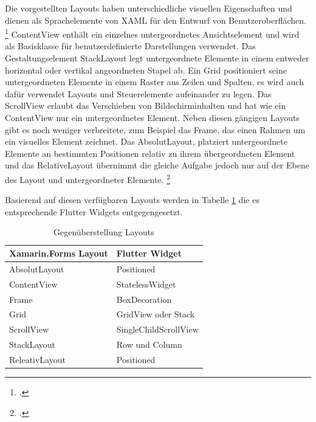 Die vorgestellten Layouts haben  unterschiedliche visuellen Eigenschaften und dienen als Sprachelemente von XAML für den Entwurf von Benutzeroberflächen.  \footcitetext[Abbildung in Anlehnung an ][Abgerufen am \today]{MicrosoftXamLayouts2018} \glq ContentView\grq{} enthält ein einzelnes untergeordnetes Ansichtselement und wird als Basisklasse für benutzerdefinierte Darstellungen verwendet.  Das Gestaltungselement \glq StackLayout\grq{} legt untergeordnete Elemente in einem entweder horizontal oder vertikal angeordneten Stapel ab.  Ein \glq Grid\grq{} positioniert seine untergeordneten Elemente in einem Raster aus Zeilen und Spalten,  es wird auch dafür verwendet Layouts und Steuerelemente aufeinander zu legen.  Das \glq ScrollView\grq{} erlaubt das Verschieben von Bildschirminhalten und hat wie ein \glq ContentView\grq{} nur ein untergeordnetes Element.  
Neben diesen gängigen Layouts gibt es noch weniger verbreitete,  zum Beispiel  das \glq  Frame\grq{}, das einen Rahmen um ein visuelles Element zeichnet.  Das \glq AbsolutLayout\grq{},  platziert untergeordnete Elemente an bestimmten Positionen relativ zu ihrem übergeordneten Element und das \glq RelativeLayout\grq{} übernimmt die gleiche Aufgabe jedoch nur auf der Ebene des Layout und untergeordneter Elemente. \footcite[Vgl.][Abgerufen am \today]{MicrosoftXamLayouts2018}

Basierend auf diesen verfügbaren Layouts werden in Tabelle \ref{tab:XamLayouts}  die es entsprechende Flutter Widgets entgegengesetzt.  

\begin{table}[!ht]
\begin{tabularx}{\textwidth}{X|X}
   \textbf{Xamarin.Forms Layout} & \textbf{Flutter Widget}  \\
\hline
	AbsolutLayout       		&  Positioned	 			\\ 
	ContentView       		&  StatelessWidget	 			\\ 
	Frame       					&  BoxDecoration     	 			\\ 
	Grid            				&  GridView oder Stack		\\ 
	ScrollView            		&  SingleChildScrollView		\\ 
	StackLayout       		&  Row und Column  	 			\\ 
	ReleativLayout           &  Positioned		\\ 

\end{tabularx}
\caption{Gegenüberstellung Layouts}
 \label{tab:XamLayouts}
\end{table}

